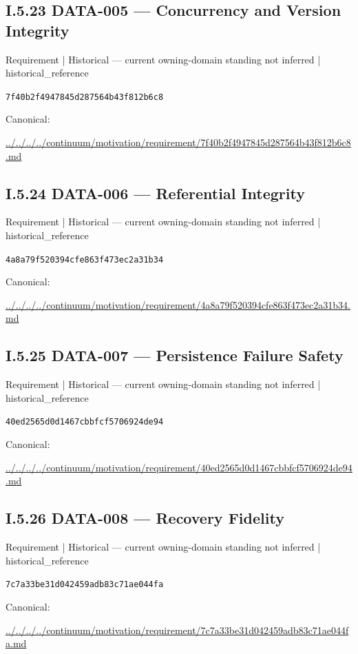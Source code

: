 \documentclass[10pt,a4paper]{article}
\begin{document}
\subsection*{I.5.23 DATA-005 — Concurrency and Version Integrity}
{\small Requirement | Historical — current owning-domain standing not inferred | historical\_reference}\par
\texttt{7f40b2f4947845d287564b43f812b6c8}\par
Canonical: \par
{\footnotesize\url{../../../../continuum/motivation/requirement/7f40b2f4947845d287564b43f812b6c8.md}}\par
\subsection*{I.5.24 DATA-006 — Referential Integrity}
{\small Requirement | Historical — current owning-domain standing not inferred | historical\_reference}\par
\texttt{4a8a79f520394cfe863f473ec2a31b34}\par
Canonical: \par
{\footnotesize\url{../../../../continuum/motivation/requirement/4a8a79f520394cfe863f473ec2a31b34.md}}\par
\subsection*{I.5.25 DATA-007 — Persistence Failure Safety}
{\small Requirement | Historical — current owning-domain standing not inferred | historical\_reference}\par
\texttt{40ed2565d0d1467cbbfcf5706924de94}\par
Canonical: \par
{\footnotesize\url{../../../../continuum/motivation/requirement/40ed2565d0d1467cbbfcf5706924de94.md}}\par
\subsection*{I.5.26 DATA-008 — Recovery Fidelity}
{\small Requirement | Historical — current owning-domain standing not inferred | historical\_reference}\par
\texttt{7c7a33be31d042459adb83c71ae044fa}\par
Canonical: \par
{\footnotesize\url{../../../../continuum/motivation/requirement/7c7a33be31d042459adb83c71ae044fa.md}}\par
\end{document}
